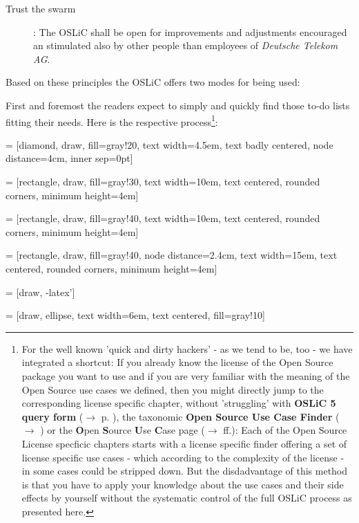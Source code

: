 \begin{description}
  \item[Trust the swarm]: The OSLiC shall be open for improvements and
  adjustments encouraged an stimulated also by other people than employees of
  \emph{Deutsche Telekom AG}.
\end{description}

Based on these principles the OSLiC offers two modes for being used:

First and foremost the readers expect to simply and quickly find those to-do
lists fitting their needs. Here is the respective process\footnote{For the well
known 'quick and dirty hackers' - as we tend to be, too - we have integrated a
shortcut: If you already know the license of the Open Source package you want to
use and if you are very familiar with the meaning of the Open Source use cases
we defined, then you might directly jump to the corresponding license specific
chapter, without 'struggling' with \textbf{OSLiC 5 query form} ($\rightarrow$ p.
\pageref{OSLiCStandardFormForGatheringInformation}), the taxonomic \textbf{Open
Source Use Case Finder} ($\rightarrow$ \pageref{OSLiCUseCaseFinder}) or the
\textbf{O}pen \textbf{S}ource \textbf{U}se \textbf{C}ase page ($\rightarrow$
\pageref{OSUCList}ff.): Each of the Open Source License specficic chapters
starts with a license specific finder offering a set of license specific use
cases - which according to the complexity of the license - in some cases could
be stripped down. But the disdadvantage of this method is that you have to apply
your knowledge about the use cases and their side effects by yourself without
the systematic control of the full OSLiC process as presented here.}:

 = [diamond, draw, fill=gray!20, 
    text width=4.5em, text badly centered, node distance=4cm, inner sep=0pt]

 = [rectangle, draw, fill=gray!30, 
    text width=10em, text centered, rounded corners, minimum height=4em]
 
 = [rectangle, draw, fill=gray!40, 
    text width=10em, text centered, rounded corners, minimum height=4em]
    
 = [rectangle, draw, fill=gray!40, node distance=2.4cm,
    text width=15em, text centered, rounded corners, minimum height=4em]
    
 = [draw, -latex']

 = [draw, ellipse, text width=6em, text centered, fill=gray!10]
 
